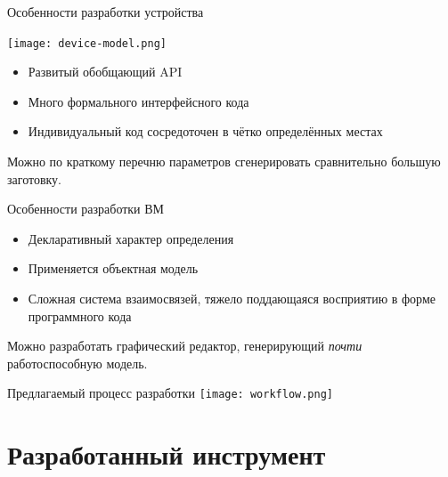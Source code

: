 \documentclass[unicode,hyperref={unicode=true}]{beamer}
\newcommand*{\sectionpagekb}{\usebeamertemplate*{section page kb}}
\theoremstyle{definition}
\theoremstyle{plain}
\begin{document}
\begin{frame}{Особенности разработки устройства}

\begin{minipage}{0.6\textwidth}
\texttt{[image: device-model.png]}
\end{minipage}
\begin{minipage}{0.38\textwidth}
\begin{itemize}
\item Развитый обобщающий API
\item Много формального интерфейсного кода
\item Индивидуальный код сосредоточен в чётко определённых местах
\end{itemize}
\end{minipage}

\begin{center}
Можно по краткому перечню параметров сгенерировать сравнительно большую
заготовку.
\end{center}

\end{frame}



\begin{frame}{Особенности разработки ВМ}

\begin{itemize}
\item Декларативный характер определения
\item Применяется объектная модель
\item Сложная система взаимосвязей, тяжело поддающаяся восприятию в форме
программного кода
\end{itemize}

\begin{center}
Можно разработать графический редактор, генерирующий {\it{}почти}
работоспособную модель.
\end{center}

\end{frame}



\begin{frame}{Предлагаемый процесс разработки}
\texttt{[image: workflow.png]}
\end{frame}



\section{Разработанный инструмент}
\frame{\sectionpagekb}
\end{document}
